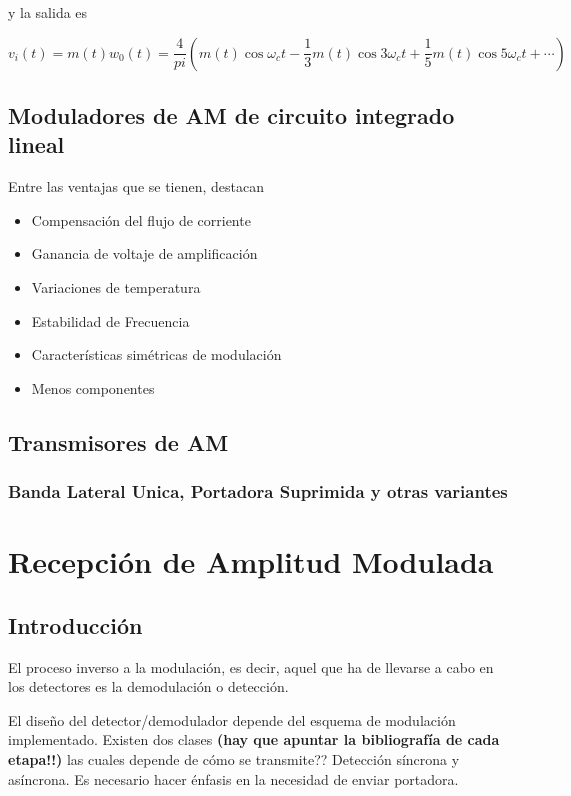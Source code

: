 \documentclass[12pt,letterpaper,titlepage,twoside]{book}
\begin{document}
y la salida es 

\begin{equation}
v_i(t) = m(t) w_0(t) = \frac{4}{pi} \left( m(t) \cos \omega_ct - \frac{1}{3} m(t) \cos 3\omega_ct +\frac{1}{5}m(t) \cos 5\omega_ct + \cdots \right) 
\end{equation}

\section{Moduladores de AM de circuito integrado lineal}

Entre las ventajas que se tienen, destacan

\begin{itemize}
\item Compensación del flujo de corriente
\item Ganancia de voltaje de amplificación
\item Variaciones de temperatura
\item Estabilidad de Frecuencia
\item Características simétricas de modulación
\item Menos componentes
\end{itemize}

\section{Transmisores de AM}
\subsection{Banda Lateral Unica, Portadora Suprimida y otras variantes}

\chapter{Recepción de Amplitud Modulada}
\section{Introducción}
El proceso inverso a la modulación, es decir, aquel que ha de llevarse a cabo en los detectores es la demodulación o detección.

El diseño del detector/demodulador depende del esquema de modulación implementado. Existen dos clases \textbf{(hay que apuntar la bibliografía de cada etapa!!)} las cuales depende de cómo se transmite?? Detección síncrona y asíncrona. Es necesario hacer énfasis en la necesidad de enviar portadora.
\end{document}
